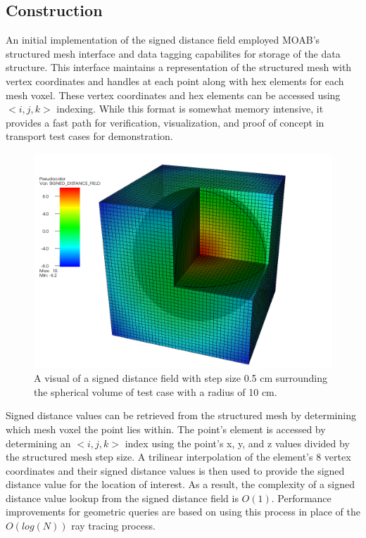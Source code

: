 \subsection{Construction}

An initial implementation of the signed distance field employed MOAB's
structured mesh interface and data tagging capabilites for storage of the data
structure. This interface maintains a representation of the structured mesh with
vertex coordinates and handles at each point along with hex elements for each
mesh voxel. These vertex coordinates and hex elements can be accessed using
$<i,j,k>$ indexing. While this format is somewhat memory intensive, it provides
a fast path for verification, visualization, and proof of concept in transport
test cases for demonstration.

\begin{figure}
  \includegraphics[scale=0.22]{../images/sdf_sphere.png}
  \caption{A visual of a signed distance field with step size 0.5 cm surrounding
    the spherical volume of test case with a radius of 10 cm.}
  \label{fig:sdf_sphere}
\end{figure}

Signed distance values can be retrieved from the structured mesh by determining
which mesh voxel the point lies within. The point's element is accessed by
determining an $<i,j,k>$ index using the point's x, y, and z values divided by
the structured mesh step size. A trilinear interpolation of the element's 8 vertex
coordinates and their signed distance values is then used to provide the signed
distance value for the location of interest. As a result, the complexity of a
signed distance value lookup from the signed distance field is
$O(1)$. Performance improvements for geometric queries are based on using this
process in place of the $O(log(N))$ ray tracing process.

